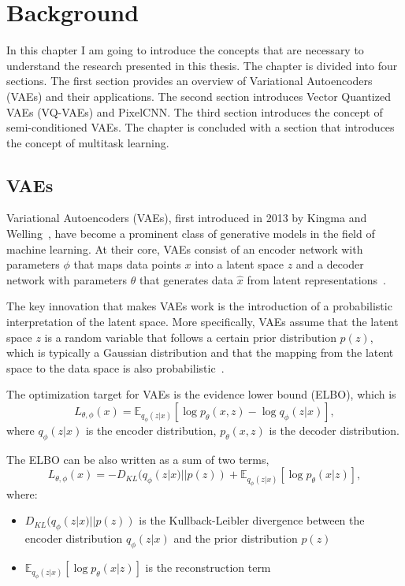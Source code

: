 \chapter{Background}

In this chapter I am going to introduce the concepts that are necessary to understand the research presented in this thesis. The chapter is divided into four sections. The first section provides an overview of Variational Autoencoders (VAEs) and their applications. The second section introduces Vector Quantized VAEs (VQ-VAEs) and PixelCNN. The third section introduces the concept of semi-conditioned VAEs. The chapter is concluded with a section that introduces the concept of multitask learning. 

\section{VAEs}

Variational Autoencoders (VAEs), first introduced in 2013 by Kingma and Welling~\cite{kingma2013autoencoding}, have become a prominent class of generative models in the field of machine learning.  At their core, VAEs consist of an encoder network with parameters $\phi$ that maps data points $x$ into a latent space $z$ and a decoder network with parameters $\theta$ that generates data $\hat{x}$ from latent representations~\cite{Kingma_2019}. 

The key innovation that makes VAEs work is the introduction of a probabilistic interpretation of the latent space. More specifically, VAEs assume that the latent space $z$ is a random variable that follows a certain prior distribution $p(z)$, which is typically a Gaussian distribution and that the mapping from the latent space to the data space is also probabilistic~\cite{kingma2013autoencoding}.

The optimization target for VAEs is the evidence lower bound (ELBO), which is
 \[ L_{\theta, \phi}(x) = \mathbb{E}_{q_{\phi}(z|x)} [\log p_{\theta}(x, z) - \log q_{\phi}(z|x)], \]
where $q_{\phi}(z|x)$ is the encoder distribution, $p_{\theta}(x, z)$ is the decoder distribution. 

The ELBO can be also written as a sum of two terms,
 \[ L_{\theta, \phi}(x) = - D_{KL}(q_{\phi}(z|x) || p(z)) + \mathbb{E}_{q_{\phi}(z|x)} [\log p_{\theta}(x|z)], \]
 where:

\begin{itemize}
    \item $D_{KL}(q_{\phi}(z|x) || p(z))$ is the Kullback-Leibler divergence between the encoder distribution $q_{\phi}(z|x)$ and the prior distribution $p(z)$
    \item $\mathbb{E}_{q_{\phi}(z|x)} [\log p_{\theta}(x|z)]$ is the reconstruction term
\end{itemize}

